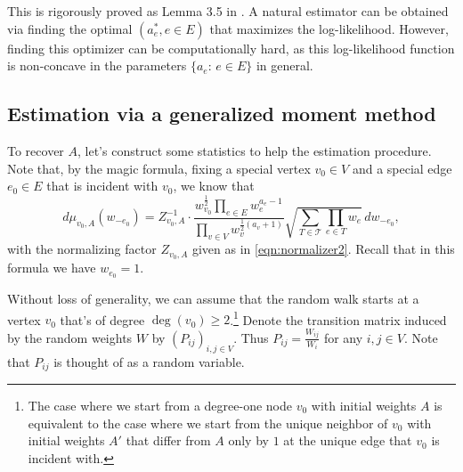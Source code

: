 \documentclass[a4paper, 11pt]{article}
\begin{document}
This is rigorously proved as Lemma 3.5 in \cite{kr00}. 
A natural estimator can be obtained via finding the optimal 
$(a^*_e, e \in E)$
that maximizes the log-likelihood. However, finding this optimizer can be computationally hard, as this log-likelihood function is non-concave in the parameters $\{a_e:\,e\in E\}$ in general. 

\subsection{Estimation via a generalized moment method}

To recover $A$, let's construct some statistics to help the estimation procedure. Note that, by the magic formula, fixing a special vertex $v_0\in V$ and a special edge $e_0\in E$ that is incident with $v_0$, we know that
\[d\mu_{v_0,A}(w_{-e_0}) = 
Z_{v_0, A}^{-1}\cdot\frac{w_{v_0}^{\frac{1}{2}}\prod_{e\in E}w_e^{a_e-1}} {\prod_{v\in V}w_v^{\frac{1}{2}(a_v+1)}}
\sqrt{\sum_{T\in\mathcal{T}}\prod_{e\in T}w_e}\,dw_{-e_0},\]
with the normalizing factor $Z_{v_0, A}$ given as in \cref{eqn:normalizer2}. Recall that in this formula we have $w_{e_0} =1$.

Without loss of generality, we can assume that the random walk starts at a vertex $v_0$ that's of degree $\deg(v_0)\geq 2$.\footnote{The case where we start from a degree-one node $v_0$ with initial weights $A$ is equivalent to the case where we start from the %
unique
neighbor of $v_0$ with initial weights $A'$ that differ from $A$ only by $1$ at the unique edge that $v_0$ is incident with.} Denote the transition matrix induced by the random weights $W$ by $(P_{ij})_{i,j\in V}$. Thus $P_{ij}=\frac{W_{ij}}{W_i}$ for any $i,j\in V$. Note that $P_{ij}$ is thought of as a random variable.
\end{document}
